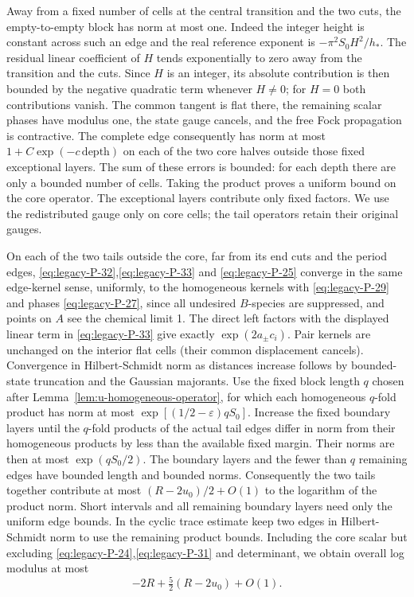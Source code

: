 Away from a fixed number of cells at the central transition and the two
cuts, the empty-to-empty block has norm at most one.  Indeed the integer
height is constant across such an edge and the real reference exponent
is $-\pi^2 S_0 H^2/h_*$.  The residual linear coefficient of $H$ tends
exponentially to zero away from the transition and the cuts.  Since
$H$ is an integer, its absolute contribution is then bounded by the
negative quadratic term whenever $H\ne0$; for $H=0$ both contributions
vanish.  The common tangent is flat there, the remaining scalar phases
have modulus one, the state gauge cancels, and the free Fock propagation
is contractive.  The complete edge consequently has norm at most
$1+C\exp(-c\,\mathrm{depth})$ on each of the two core halves outside
those fixed exceptional layers.  The sum of these errors is bounded:
for each depth there are only a bounded number of cells.  Taking the
product proves a uniform bound on the core operator.  The exceptional
layers contribute only fixed factors.  We use the redistributed gauge
only on core cells; the tail operators retain their original gauges.

On each of the two tails outside the core, far from its end cuts and the period edges, \eqref{eq:legacy-P-32},\allowbreak\eqref{eq:legacy-P-33} and \eqref{eq:legacy-P-25} converge in the same edge-kernel sense, uniformly, to the homogeneous kernels with \eqref{eq:legacy-P-29} and phases \eqref{eq:legacy-P-27}, since all undesired \(B\)-species are suppressed, and points on \(A\) see the chemical limit 1. The direct left factors with the displayed linear term in \eqref{eq:legacy-P-33} give exactly \(\exp(2a_\pm c_i)\). Pair kernels are unchanged on the interior flat cells (their common displacement cancels). Convergence in Hilbert-Schmidt norm as distances increase follows by bounded-state truncation and the Gaussian majorants. Use the fixed block length $q$ chosen after Lemma~\ref{lem:u-homogeneous-operator}, for which each homogeneous $q$-fold product has norm at most
$\exp[(1/2-\varepsilon)qS_0]$. Increase the fixed boundary layers
until the $q$-fold products of the actual tail edges differ in norm
from their homogeneous products by less than the available fixed
margin.  Their norms are then at most $\exp(qS_0/2)$.  The boundary
layers and the fewer than $q$ remaining edges have bounded length and
bounded norms.  Consequently the two tails together contribute at
most \((R-2u_0)/2+O(1)\) to the logarithm of the product norm. Short intervals and all remaining boundary layers need only the uniform edge bounds. In the cyclic trace estimate keep two edges in Hilbert-Schmidt norm to use the remaining product bounds. Including the core scalar but excluding \eqref{eq:legacy-P-24},\allowbreak\eqref{eq:legacy-P-31} and determinant, we obtain overall log modulus at most
\begin{equation}
 -2R+\tfrac52(R-2u_0)+O(1).
 \label{eq:legacy-P-34}
\end{equation}



